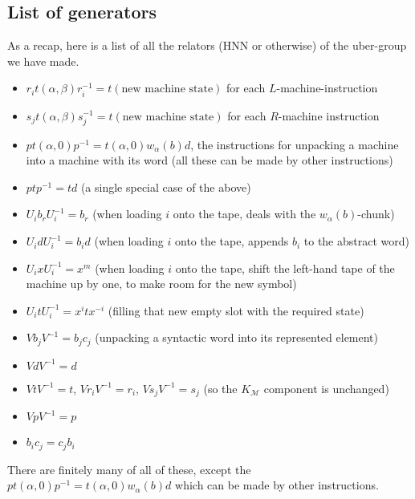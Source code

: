 \documentclass[11pt]{amsart}
\theoremstyle{remark}
\begin{document}
\subsection{List of generators}
As a recap, here is a list of all the relators (HNN or otherwise) of the uber-group we have made.

\begin{itemize}
\item $r_i t(\alpha, \beta) r_i^{-1} = t(\text{new machine state})$ for each $L$-machine-instruction
\item $s_j t(\alpha, \beta) s_j^{-1} = t(\text{new machine state})$ for each $R$-machine instruction
\item $p t(\alpha, 0) p^{-1} = t(\alpha, 0) w_{\alpha}(b) d$, the instructions for unpacking a machine into a machine with its word (all these can be made by other instructions)
\item $p t p^{-1} = t d$ (a single special case of the above)
\item $U_i b_r U_i^{-1} = b_r$ (when loading $i$ onto the tape, deals with the $w_{\alpha}(b)$-chunk)
\item $U_i d U_i^{-1} = b_i d$ (when loading $i$ onto the tape, appends $b_i$ to the abstract word)
\item $U_i x U_i^{-1} = x^m$ (when loading $i$ onto the tape, shift the left-hand tape of the machine up by one, to make room for the new symbol)
\item $U_i t U_i^{-1} = x^i t x^{-i}$ (filling that new empty slot with the required state)
\item $V b_j V^{-1} = b_j c_j$ (unpacking a syntactic word into its represented element)
\item $V d V^{-1} = d$
\item $V t V^{-1} = t$, $V r_i V^{-1} = r_i$, $V s_j V^{-1} = s_j$ (so the $K_{\mathcal{M}}$ component is unchanged)
\item $V p V^{-1} = p$ 
\item $b_i c_j = c_j b_i$
\end{itemize}

There are finitely many of all of these, except the $p t(\alpha, 0) p^{-1} = t(\alpha, 0) w_{\alpha}(b) d$ which can be made by other instructions.
\end{document}
